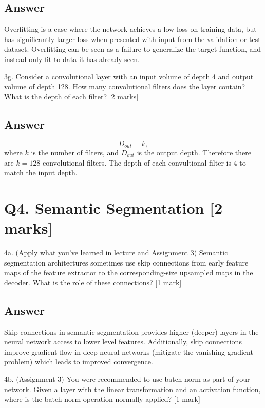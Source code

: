 \documentclass[
	12pt, %
]{fphw}
\begin{document}
\subsection*{Answer}
Overfitting is a case where the network achieves a low loss on training data, but has significantly larger loss when presented with input from the validation or test dataset. Overfitting can be seen as a failure to generalize the target function, and instead only fit to data it has already seen.
\begin{problem}
3g. Consider a convolutional layer with an input volume of depth 4 and output volume of
depth 128. How many convolutional filters does the layer contain? What is the depth of
each filter? [2 marks]
\end{problem}
\subsection*{Answer}
\begin{equation}
	D_{out} = k,
\end{equation}
where $k$ is the number of filters, and $D_{out}$ is the output depth. Therefore there are $k=128$ convolutional filters. The depth of each convultional filter is 4 to match the input depth.
\section*{Q4. Semantic Segmentation [2 marks]}
\begin{problem}
4a. (Apply what you’ve learned in lecture and Assignment 3) Semantic segmentation
architectures sometimes use skip connections from early feature maps of the feature
extractor to the corresponding-size upsampled maps in the decoder. What is the role of
these connections? [1 mark]
\end{problem}
\subsection*{Answer}
Skip connections in semantic segmentation provides higher (deeper) layers in the neural network access to lower level features. Additionally, skip connections improve gradient flow in deep neural networks (mitigate the vanishing gradient problem) which leads to improved convergence.
\begin{problem}
4b. (Assignment 3) You were recommended to use batch norm as part of your network.
Given a layer with the linear transformation and an activation function, where is the batch
norm operation normally applied? [1 mark]
\end{problem}
\end{document}
